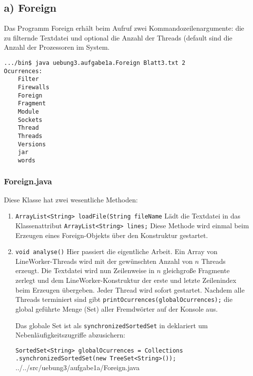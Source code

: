 \subsection*{a) Foreign}

Das Programm Foreign erhält beim Aufruf zwei Kommandozeilenargumente: die zu filternde Textdatei und optional die Anzahl der Threads (default sind die Anzahl der Prozessoren im System.

\begin{verbatim}
.../bin$ java uebung3.aufgabe1a.Foreign Blatt3.txt 2
Ocurrences:
	Filter
	Firewalls
	Foreign
	Fragment
	Module
	Sockets
	Thread
	Threads
	Versions
	jar
	words
\end{verbatim}

\subsubsection*{Foreign.java}

Diese Klasse hat zwei wesentliche Methoden:
\begin{enumerate}

\item \texttt{ArrayList<String> loadFile(String fileName}
Lädt die Textdatei in das Klassenattribut \texttt{ArrayList<String> lines;}
Diese Methode wird einmal beim Erzeugen eines Foreign-Objekts über den Konstruktur gestartet.

\item \texttt{void analyse()}
Hier passiert die eigentliche Arbeit. Ein Array von LineWorker-Threads wird mit der gewünschten Anzahl von $n$ Threads erzeugt. Die Textdatei wird nun Zeilenweise in $n$ gleichgroße Fragmente zerlegt und dem LineWorker-Konstruktur der erste und letzte Zeilenindex beim Erzeugen übergeben. Jeder Thread wird sofort gestartet. Nachdem alle Threads terminiert sind gibt \texttt{printOcurrences(globalOcurrences);} die global geführte Menge (Set) aller Fremdwörter auf der Konsole aus.

Das globale Set ist als \texttt{synchronizedSortedSet} in deklariert um Nebenläufigkeitszugriffe abzusichern:

\texttt{SortedSet<String> globalOcurrences = Collections
			.synchronizedSortedSet(new TreeSet<String>());}
\\


{../../src/uebung3/aufgabe1a/Foreign.java}

\end{enumerate}

